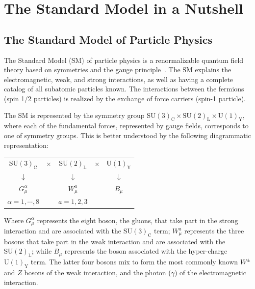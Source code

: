 \chapter{The Standard Model in a Nutshell}
\section{The Standard Model of Particle Physics}
The Standard Model (SM) of particle physics is a renormalizable
quantum field theory based on symmetries and the gauge principle~\cite{HOOF,WeinbergLeptons}. The
SM explains the electromagnetic, weak, and strong interactions, as
well as having a complete catalog of all subatomic particles
known. The interactions between the fermions (spin 1/2 particles) is
realized by the exchange of force carriers (spin-1 particle).

The SM is represented by the symmetry group $\mathrm{SU(3)_{C}} \times
\mathrm{SU(2)_{L}} \times \mathrm{U(1)_{Y}}$, where each of the
fundamental forces, represented by gauge fields, corresponds to one of
symmetry groups. This is better understood by the following
diagrammatic representation:

\begin{center}
\begin{tabular}{ c c c c c }
  $\mathrm{SU(3)_{C}}$ & $\times$ & $\mathrm{SU(2)_{L}}$ & $\times$ & $\mathrm{U(1)_{Y}}$\\
  $\downarrow$ &  & $\downarrow$ & & $\downarrow$\\
  $G^{\alpha}_{\mu}$ &  & $W^{a}_{\mu}$& &$B_{\mu}$ \\
  $\alpha = 1,\cdots,8$ & & $a = 1,2,3$ & & \\
\end{tabular}
\end{center}

Where $G^{\alpha}_{\mu}$ represents the eight boson, the gluons, that take part in
the strong interaction and are associated with the
$\mathrm{SU(3)_{C}}$ term;  $W^{a}_{\mu}$ represents the three bosons
that take part in the weak interaction and are associated with the
$\mathrm{SU(2)_{L}}$; while $B_{\mu}$ represents the boson associated
with the hyper-charge $\mathrm{U(1)_{Y}}$ term. The latter four bosons
mix to form the most commonly known $W^{\pm}$ and $Z$ bosons of the
weak interaction, and the photon ($\gamma$) of the electromagnetic
interaction.

